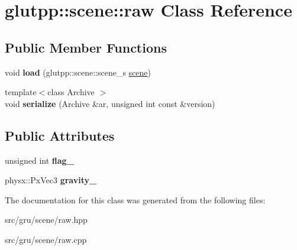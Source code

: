 \hypertarget{classglutpp_1_1scene_1_1raw}{\section{glutpp\-:\-:scene\-:\-:raw \-Class \-Reference}
\label{classglutpp_1_1scene_1_1raw}
}
\subsection*{\-Public \-Member \-Functions}
\begin{DoxyCompactItemize}
\item 
\hypertarget{classglutpp_1_1scene_1_1raw_a7c6d4bcc40c2382e663e343843986d58}{void {\bfseries load} (glutpp\-::scene\-::scene\-\_\-s \hyperlink{classglutpp_1_1scene_1_1scene}{scene})}\label{classglutpp_1_1scene_1_1raw_a7c6d4bcc40c2382e663e343843986d58}

\item 
\hypertarget{classglutpp_1_1scene_1_1raw_ae3066d954cd99a2551da179be7612af0}{{\footnotesize template$<$class Archive $>$ }\\void {\bfseries serialize} (\-Archive \&ar, unsigned int const \&version)}\label{classglutpp_1_1scene_1_1raw_ae3066d954cd99a2551da179be7612af0}

\end{DoxyCompactItemize}
\subsection*{\-Public \-Attributes}
\begin{DoxyCompactItemize}
\item 
\hypertarget{classglutpp_1_1scene_1_1raw_a7ea24c9872420ab621799bbb2d47c73d}{unsigned int {\bfseries flag\-\_\-}}\label{classglutpp_1_1scene_1_1raw_a7ea24c9872420ab621799bbb2d47c73d}

\item 
\hypertarget{classglutpp_1_1scene_1_1raw_a86841c5a5a09e63e0c3f6cff374db7de}{physx\-::\-Px\-Vec3 {\bfseries gravity\-\_\-}}\label{classglutpp_1_1scene_1_1raw_a86841c5a5a09e63e0c3f6cff374db7de}

\end{DoxyCompactItemize}


\-The documentation for this class was generated from the following files\-:\begin{DoxyCompactItemize}
\item 
src/gru/scene/raw.\-hpp\item 
src/gru/scene/raw.\-cpp\end{DoxyCompactItemize}
